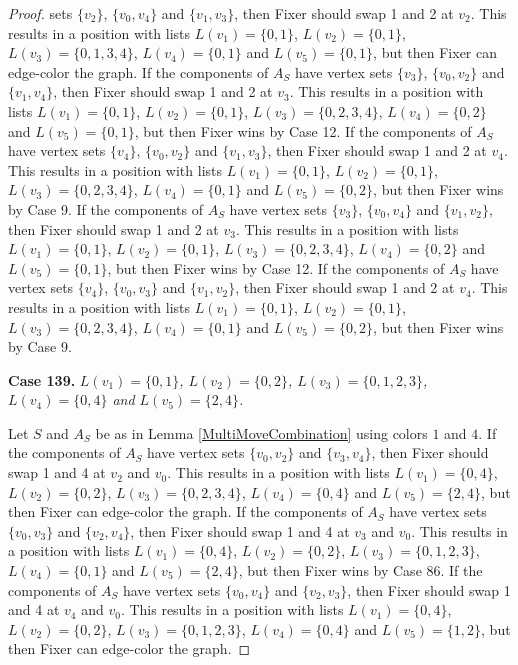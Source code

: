 \documentclass[12pt]{amsart}
\theoremstyle{plain}
\theoremstyle{definition}
\theoremstyle{remark}
\begin{document}
\begin{proof}
sets $\{v_2\}$, $\{v_0, v_4\}$ and $\{v_1, v_3\}$, then Fixer should swap 1 and 2 at $v_2$. This results in a position with lists $L(v_1) = \{0, 1\}$, $L(v_2) = \{0, 1\}$, $L(v_3) = \{0, 1, 3, 4\}$, $L(v_4) = \{0, 1\}$ and $L(v_5) = \{0, 1\}$, but then Fixer can edge-color the graph. If the components of $A_S$ have vertex sets $\{v_3\}$, $\{v_0, v_2\}$ and $\{v_1, v_4\}$, then Fixer should swap 1 and 2 at $v_3$. This results in a position with lists $L(v_1) = \{0, 1\}$, $L(v_2) = \{0, 1\}$, $L(v_3) = \{0, 2, 3, 4\}$, $L(v_4) = \{0, 2\}$ and $L(v_5) = \{0, 1\}$, but then Fixer wins by Case 12. If the components of $A_S$ have vertex sets $\{v_4\}$, $\{v_0, v_2\}$ and $\{v_1, v_3\}$, then Fixer should swap 1 and 2 at $v_4$. This results in a position with lists $L(v_1) = \{0, 1\}$, $L(v_2) = \{0, 1\}$, $L(v_3) = \{0, 2, 3, 4\}$, $L(v_4) = \{0, 1\}$ and $L(v_5) = \{0, 2\}$, but then Fixer wins by Case 9. If the components of $A_S$ have vertex sets $\{v_3\}$, $\{v_0, v_4\}$ and $\{v_1, v_2\}$, then Fixer should swap 1 and 2 at $v_3$. This results in a position with lists $L(v_1) = \{0, 1\}$, $L(v_2) = \{0, 1\}$, $L(v_3) = \{0, 2, 3, 4\}$, $L(v_4) = \{0, 2\}$ and $L(v_5) = \{0, 1\}$, but then Fixer wins by Case 12. If the components of $A_S$ have vertex sets $\{v_4\}$, $\{v_0, v_3\}$ and $\{v_1, v_2\}$, then Fixer should swap 1 and 2 at $v_4$. This results in a position with lists $L(v_1) = \{0, 1\}$, $L(v_2) = \{0, 1\}$, $L(v_3) = \{0, 2, 3, 4\}$, $L(v_4) = \{0, 1\}$ and $L(v_5) = \{0, 2\}$, but then Fixer wins by Case 9. 

\noindent\textbf{Case 139.  }\textit{$L(v_1) = \{0, 1\}$, $L(v_2) = \{0, 2\}$, $L(v_3) = \{0, 1, 2, 3\}$, $L(v_4) = \{0, 4\}$ and $L(v_5) = \{2, 4\}$.}

Let $S$ and $A_S$ be as in Lemma \ref{MultiMoveCombination} using colors $1$ and $4$. If the components of $A_S$ have vertex sets $\{v_0, v_2\}$ and $\{v_3, v_4\}$, then Fixer should swap 1 and 4 at $v_2$ and $v_0$. This results in a position with lists $L(v_1) = \{0, 4\}$, $L(v_2) = \{0, 2\}$, $L(v_3) = \{0, 2, 3, 4\}$, $L(v_4) = \{0, 4\}$ and $L(v_5) = \{2, 4\}$, but then Fixer can edge-color the graph. If the components of $A_S$ have vertex sets $\{v_0, v_3\}$ and $\{v_2, v_4\}$, then Fixer should swap 1 and 4 at $v_3$ and $v_0$. This results in a position with lists $L(v_1) = \{0, 4\}$, $L(v_2) = \{0, 2\}$, $L(v_3) = \{0, 1, 2, 3\}$, $L(v_4) = \{0, 1\}$ and $L(v_5) = \{2, 4\}$, but then Fixer wins by Case 86. If the components of $A_S$ have vertex sets $\{v_0, v_4\}$ and $\{v_2, v_3\}$, then Fixer should swap 1 and 4 at $v_4$ and $v_0$. This results in a position with lists $L(v_1) = \{0, 4\}$, $L(v_2) = \{0, 2\}$, $L(v_3) = \{0, 1, 2, 3\}$, $L(v_4) = \{0, 4\}$ and $L(v_5) = \{1, 2\}$, but then Fixer can edge-color the graph. 


\end{proof}
\end{document}
